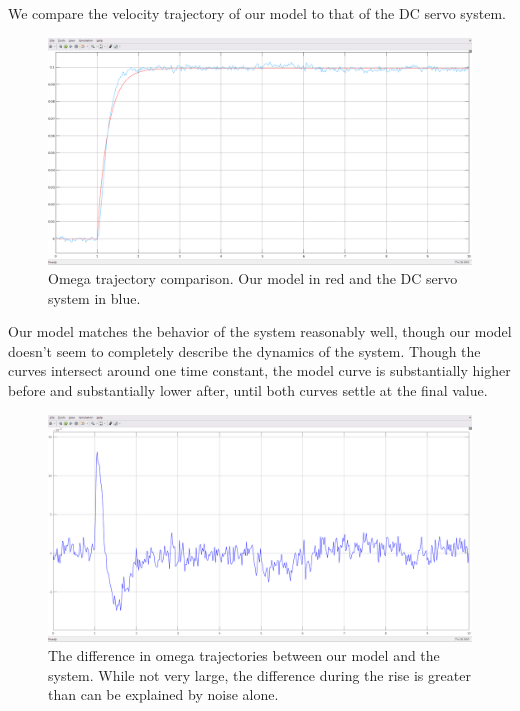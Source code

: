 \documentclass[11pt,a4paper]{article}
\begin{document}
We compare the velocity trajectory of our model to that of the DC servo system. 

\begin{figure}[here]
\includegraphics[width=\textwidth]{imglab/lab2sol_comp2.png}
\caption{Omega trajectory comparison. Our model in red and the DC servo system in blue. }
\label{fig:comp2}
\end{figure}

Our model matches the behavior of the system reasonably well, though our model doesn't seem to completely describe the dynamics of the system. Though the curves intersect around one time constant, the model curve is substantially higher before and substantially lower after, until both curves settle at the final value.

\begin{figure}[here]
\includegraphics[width=\textwidth]{imglab/lab2sol_mismatch.png}
\caption{The difference in omega trajectories between our model and the system. While not very large, the difference during the rise is greater than can be explained by noise alone. }
\label{fig:comp3}
\end{figure}
\end{document}
